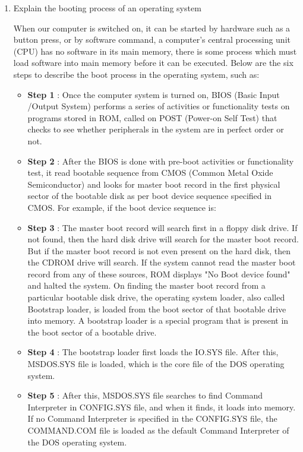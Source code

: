 \documentclass{article}
\newenvironment{problem}{\begin{enumerate}[label=\bfseries\alph*.]\large\bfseries}{\end{enumerate}}
\newenvironment{answered}{\par\normalfont}{}
\begin{document}
\begin{problem}
    \item {Explain the booting process of an operating system}
        \begin{answered}
            When our computer is switched on, it can be started by hardware such as a button press, or by software command, a computer's central processing unit (CPU) has no software in its main memory, there is some process which must load software into main memory before it can be executed. Below are the six steps to describe the boot process in the operating system, such as:
            \begin{itemize}
                \item \textbf{Step 1} : Once the computer system is turned on, BIOS (Basic Input /Output System) performs a series of activities or functionality tests on programs stored in ROM, called on POST (Power-on Self Test) that checks to see whether peripherals in the system are in perfect order or not.

                \item \textbf{Step 2} : After the BIOS is done with pre-boot activities or functionality test, it read bootable sequence from CMOS (Common Metal Oxide Semiconductor) and looks for master boot record in the first physical sector of the bootable disk as per boot device sequence specified in CMOS. For example, if the boot device sequence is:

                \item \textbf{Step 3} : The master boot record will search first in a floppy disk drive. If not found, then the hard disk drive will search for the master boot record. But if the master boot record is not even present on the hard disk, then the CDROM drive will search. If the system cannot read the master boot record from any of these sources, ROM displays "No Boot device found" and halted the system. On finding the master boot record from a particular bootable disk drive, the operating system loader, also called Bootstrap loader, is loaded from the boot sector of that bootable drive into memory. A bootstrap loader is a special program that is present in the boot sector of a bootable drive.

                \item \textbf{Step 4} : The bootstrap loader first loads the IO.SYS file. After this, MSDOS.SYS file is loaded, which is the core file of the DOS operating system.

                \item \textbf{Step 5} : After this, MSDOS.SYS file searches to find Command Interpreter in CONFIG.SYS file, and when it finds, it loads into memory. If no Command Interpreter is specified in the CONFIG.SYS file, the COMMAND.COM file is loaded as the default Command Interpreter of the DOS operating system.


\end{itemize}
\end{answered}
\end{problem}
\end{document}
